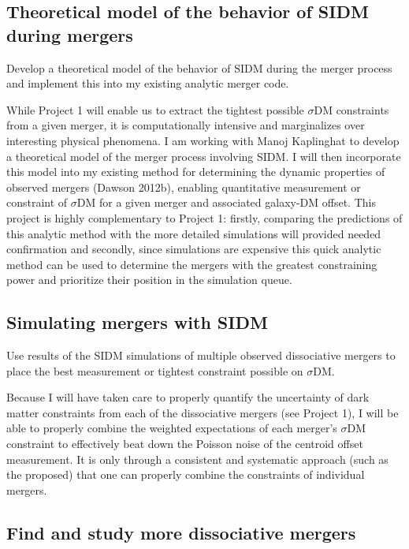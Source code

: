 \subsection{Theoretical model of the behavior of SIDM during mergers}

Develop a theoretical model of the behavior of SIDM during the merger process and implement this into my existing analytic merger code. 

While Project 1 will enable us to extract the tightest possible $\sigma$DM  constraints from a given merger, it is computationally intensive and marginalizes over interesting physical phenomena.  I am working with Manoj Kaplinghat to develop a theoretical model of the merger process involving SIDM.  I will then incorporate this model into my existing method for determining the dynamic properties of observed mergers (Dawson 2012b), enabling quantitative measurement or constraint of $\sigma$DM  for a given merger and associated galaxy-DM offset.  This project is highly complementary to Project 1: firstly, comparing the predictions of this analytic method with the more detailed simulations will provided needed confirmation and secondly, since simulations are expensive this quick analytic method can be used to determine the mergers with the greatest constraining power and prioritize their position in the simulation queue.

\subsection{Simulating mergers with SIDM}

Use results of the SIDM simulations of multiple observed dissociative mergers to place the best measurement or tightest constraint possible on $\sigma$DM.  

Because I will have taken care to properly quantify the uncertainty of dark matter constraints from each of the dissociative mergers (see Project 1), I will be able to properly combine the weighted expectations of each merger’s $\sigma$DM  constraint to effectively beat down the Poisson noise of the centroid offset measurement.   It is only through a consistent and systematic approach (such as the proposed) that one can properly combine the constraints of individual mergers. 

\subsection{Find and study more dissociative mergers}

